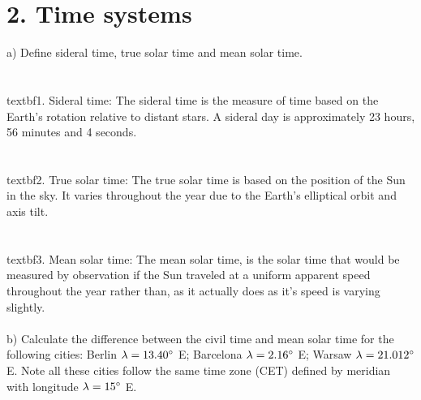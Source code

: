 \section*{2. Time systems}

a) Define sideral time, true solar time and mean solar time.\\
\\
\\textbf{1. Sideral time:} The sideral time is the measure of time based on the Earth's rotation relative
to distant stars. A sideral day is approximately 23 hours, 56 minutes and 4 seconds.\\
\\
\\textbf{2. True solar time:} The true solar time is based on the position of the Sun in the sky. It 
varies throughout the year due to the Earth's elliptical orbit and axis tilt.\\
\\
\\textbf{3. Mean solar time:} The mean solar time, is the solar time that would be measured by 
observation if the Sun traveled at a uniform apparent speed throughout the year rather than, as it 
actually does as it's speed is varying slightly.\\
\\
b) Calculate the difference between the civil time and mean solar time for the following cities: Berlin
$\lambda = 13.40 \degree$ E; Barcelona $\lambda = 2.16 \degree$ E; Warsaw $\lambda = 21.012 \degree$ E.
Note all these cities follow the same time zone (CET) defined by meridian with longitude 
$\lambda = 15 \degree$ E.\\
\\

